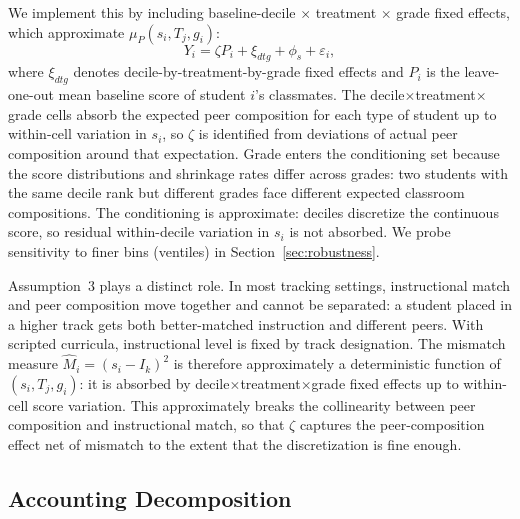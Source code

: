 \documentclass[11pt]{article}
\begin{document}
We implement this by including baseline-decile $\times$ treatment $\times$ grade fixed effects, which approximate $\mu_P(s_i, T_j, g_i)$:
\begin{equation}
\label{eq:bh}
Y_i = \zeta P_i + \xi_{dtg} + \phi_s + \varepsilon_i,
\end{equation}
where $\xi_{dtg}$ denotes decile-by-treatment-by-grade fixed effects and $P_i$ is the leave-one-out mean baseline score of student $i$'s classmates. The decile$\times$treatment$\times$grade cells absorb the expected peer composition for each type of student up to within-cell variation in $s_i$, so $\zeta$ is identified from deviations of actual peer composition around that expectation. Grade enters the conditioning set because the score distributions and shrinkage rates differ across grades: two students with the same decile rank but different grades face different expected classroom compositions. The conditioning is approximate: deciles discretize the continuous score, so residual within-decile variation in $s_i$ is not absorbed. We probe sensitivity to finer bins (ventiles) in Section~\ref{sec:robustness}.

Assumption~3 plays a distinct role. In most tracking settings, instructional match and peer composition move together and cannot be separated: a student placed in a higher track gets both better-matched instruction and different peers. With scripted curricula, instructional level is fixed by track designation. The mismatch measure $\hat{M}_i = (s_i - I_{k})^2$ is therefore approximately a deterministic function of $(s_i, T_j, g_i)$: it is absorbed by decile$\times$treatment$\times$grade fixed effects up to within-cell score variation. This approximately breaks the collinearity between peer composition and instructional match, so that $\zeta$ captures the peer-composition effect net of mismatch to the extent that the discretization is fine enough.


\subsection{Accounting Decomposition}
\label{sec:accounting}
\end{document}
